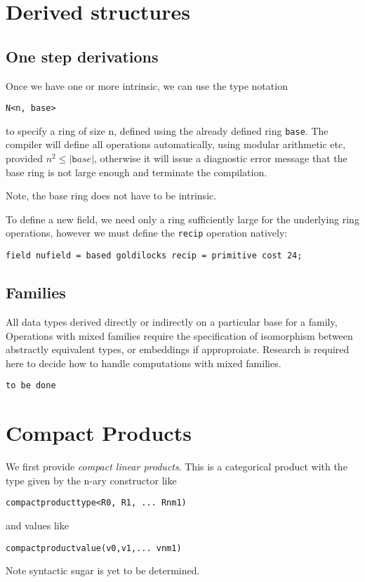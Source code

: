 \documentclass[oneside]{book}
\theoremstyle{plain}
\theoremstyle{definition}
\theoremstyle{plain}
\begin{document}
\section{Derived structures}
\subsection{One step derivations}
Once we have one or more intrinsic, we can use the type notation
\begin{verbatim}
N<n, base>
\end{verbatim}
to specify a ring of size n, defined using the already defined ring \verb$base$.
The compiler will define all operations automatically, using modular arithmetic
etc, provided $n^2\leq |{\mathtt base}|$, otherwise it will issue a diagnostic
error message that the base ring is not large enough and terminate the compilation.

Note, the base ring does not have to be intrinsic.

To define a new field, we need only a ring sufficiently large for the underlying
ring operations, however we must define the \verb$recip$ operation natively:
\begin{verbatim}
field nufield = based goldilocks recip = primitive cost 24;
\end{verbatim}

\subsection{Families}
All data types derived directly or indirectly on a particular
base for a family, Operations with mixed families require
the specification of isomorphism between abstractly equivalent types,
or embeddings if approproiate. Research is required here to decide
how to handle computations with mixed families.
\begin{verbatim}
to be done
\end{verbatim}

\section{Compact Products}
We first provide {\em compact linear products}. This is a categorical product
with the type given by the n-ary constructor like
\begin{verbatim}
compactproducttype<R0, R1, ... Rnm1)
\end{verbatim}
and values like
\begin{verbatim}
compactproductvalue(v0,v1,... vnm1)
\end{verbatim}
Note syntactic sugar is yet to be determined.
\end{document}
